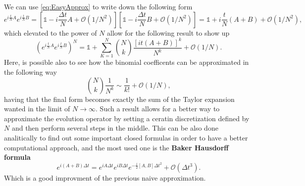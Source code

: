 {
    We can use \eqref{eq:EasyApprox} to write down the following form
    \begin{equation}
        e^{i\frac{t}{N}A}e^{i\frac{t}{N}B} = \left[ \mathbb{1} - i\frac{\Delta t}{N}A + \mathcal{O}(1/N^2) \right]\left[ \mathbb{1} - i\frac{\Delta t}{N}B + \mathcal{O}(1/N^2) \right] = \mathbb{1} + i\frac{t}{N}\left( A + B \right) + \mathcal{O}(1/N^2),
    \end{equation}
    which elevated to the power of $N$ allow for the following result to show up
    \begin{equation}
        \left( e^{i\frac{t}{N}A}e^{i\frac{t}{N}B} \right)^N = \mathbb{1} + \sum_{K=1}^N \binom{N}{k}\frac{\left[ it\left( A + B \right) \right]^k}{N^k} + \mathcal{O}(1/N). 
    \end{equation}
    Here, is possible also to see how the binomial coefficents can be approximated in the following way
    \begin{equation}
        \binom{N}{k} \frac{1}{N^k} \sim \frac{1}{k!} + \mathcal{O}(1/N),
    \end{equation}
    having that the final form becomes exactly the sum of the Taylor expansion wanted in the limit of $N\to\infty$.
}
\noindent
Such a result allows for a better way to approximate the evolution operator by setting a ceratin discretization defined by $N$ and then perform several steps in the middle. This can be also done analitically to find out some important closed formulas in order to have a better computational approach, and the most used one is the \textbf{Baker Hausdorff formula}
\begin{equation}
    e^{i(A+B)\Delta t} = e^{iA\Delta t}e^{iB\Delta t} e^{-\frac{i}{2}[A, B]\Delta t^2} + \mathcal{O}(\Delta t^3).
\end{equation}
Which is a good improvment of the previous naive approximation.

